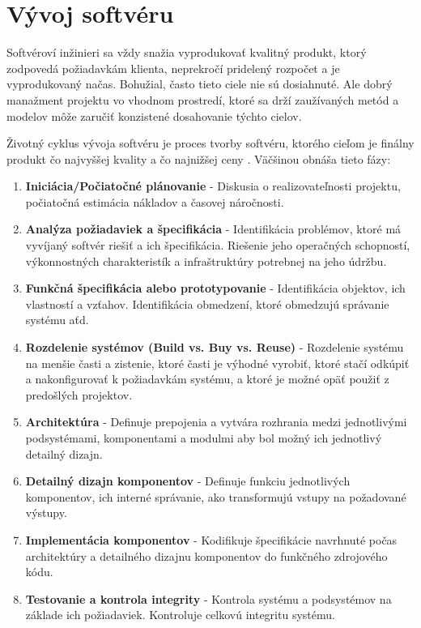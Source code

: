\documentclass[10pt,twoside,slovak,a4paper]{article}
\begin{document}
\section{Vývoj softvéru} \label{vyvojSoftveru}

Softvéroví inžinieri sa vždy snažia vyprodukovať kvalitný produkt, ktorý zodpovedá požiadavkám klienta, neprekročí pridelený rozpočet a je vyprodukovaný načas. Bohužial, často tieto ciele nie sú dosiahnuté. Ale dobrý manažment projektu vo vhodnom prostredí, ktoré sa drží zaužívaných metód a modelov môže zaručiť konzistené dosahovanie týchto cielov. \cite{Methodologies}

Životný cyklus vývoja softvéru je proces tvorby softvéru, ktorého cieľom je finálny produkt čo najvyššej kvality a čo najnižšej ceny \cite{SDLCdef}. Väčšinou obnáša tieto fázy:\cite{SDCLphases}
\begin{sloppypar}
\begin{enumerate}
\item \textbf{Iniciácia/Počiatočné plánovanie} - Diskusia o realizovateľnosti projektu, počiatočná estimácia nákladov a časovej náročnosti.
\item \textbf{Analýza požiadaviek a špecifikácia} - Identifikácia problémov, ktoré má vyvíjaný softvér riešiť a ich špecifikácia. Riešenie jeho operačných schopností, výkonnostných charakteristík a infraštruktúry potrebnej na jeho údržbu.
\item \textbf{Funkčná špecifikácia alebo prototypovanie} - Identifikácia objektov, ich vlastností a vzťahov. Identifikácia obmedzení, ktoré obmedzujú správanie systému aťd. 
\item \textbf{Rozdelenie systémov (Build vs. Buy vs. Reuse)} - Rozdelenie systému na menšie časti a zistenie, ktoré časti je výhodné vyrobiť, ktoré stačí odkúpiť a nakonfigurovať k požiadavkám systému, a ktoré je možné opäť použiť z predošlých projektov.
\item \textbf{Architektúra} - Definuje prepojenia a vytvára rozhrania medzi jednotlivými podsystémami, komponentami a modulmi aby bol možný ich jednotlivý detailný dizajn.
\item \textbf{Detailný dizajn komponentov} - Definuje funkciu jednotlivých komponentov, ich interné správanie, ako transformujú vstupy na požadované výstupy.
\item \textbf{Implementácia komponentov} - Kodifikuje špecifikácie navrhnuté počas architektúry a detailného dizajnu komponentov do funkčného zdrojového kódu.
\item \textbf{Testovanie a kontrola integrity} - Kontrola systému a podsystémov na základe ich požiadaviek. Kontroluje celkovú integritu systému.

\end{enumerate}
\end{sloppypar}
\end{document}

